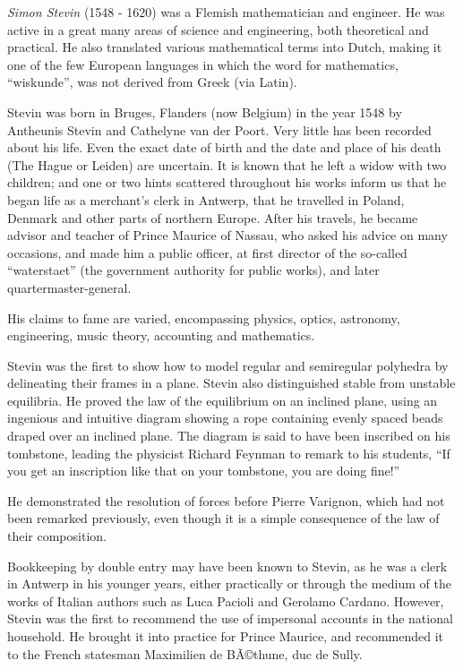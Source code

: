 \documentclass[12pt]{article}
\begin{document}
{\em Simon Stevin} (1548 - 1620) was a Flemish mathematician and engineer. He was active in a great many areas of science and engineering, both theoretical and practical. He also translated various mathematical terms into Dutch, making it one of the few European languages in which the word for mathematics,  ``wiskunde'', was not derived from Greek (via Latin).

Stevin was born in Bruges, Flanders (now Belgium) in the year 1548 by Antheunis Stevin and Cathelyne van der Poort. Very little has been recorded about his life. Even the exact date of birth and the date and place of his death (The Hague or Leiden) are uncertain. It is known that he left a widow with two children; and one or two hints scattered throughout his works inform us that he began life as a merchant's clerk in Antwerp, that he travelled in Poland, Denmark and other parts of northern Europe. After his travels, he became advisor and teacher of Prince Maurice of Nassau, who asked his advice on many occasions, and made him a public officer, at first director of the so-called ``waterstaet'' (the government authority for public works), and later quartermaster-general.

His claims to fame are varied, encompassing physics, optics, astronomy, engineering, music theory, accounting and mathematics.

Stevin was the first to show how to model regular and semiregular polyhedra by delineating their frames in a plane. Stevin also distinguished stable from unstable equilibria. He proved the law of the equilibrium on an inclined plane, using an ingenious and intuitive diagram showing a rope containing evenly spaced beads draped over an inclined plane. The diagram is said to have been inscribed on his tombstone, leading the physicist Richard Feynman to remark to his students, ``If you get an inscription like that on your tombstone, you are doing fine!''

He demonstrated the resolution of forces before Pierre Varignon, which had not been remarked previously, even though it is a simple consequence of the law of their composition. 

Bookkeeping by double entry may have been known to Stevin, as he was a clerk in Antwerp in his younger years, either practically or through the medium of the works of Italian authors such as Luca Pacioli and Gerolamo Cardano. However, Stevin was the first to recommend the use of impersonal accounts in the national household. He brought it into practice for Prince Maurice, and recommended it to the French statesman Maximilien de BÃ©thune, duc de Sully.
\end{document}

